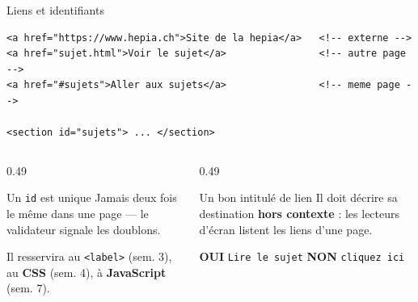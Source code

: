 \documentclass[aspectratio=169,11pt]{beamer}
\begin{document}
\begin{frame}[fragile]{Liens et identifiants}
\begin{lstlisting}[language=HTML5]
<a href="https://www.hepia.ch">Site de la hepia</a>   <!-- externe -->
<a href="sujet.html">Voir le sujet</a>                <!-- autre page -->
<a href="#sujets">Aller aux sujets</a>                <!-- meme page -->

<section id="sujets"> ... </section>
\end{lstlisting}
  \vspace{0.15cm}
  \begin{columns}[T]
    \begin{column}{0.49\textwidth}
      \begin{alertblock}{Un \texttt{id} est unique}
        Jamais deux fois le même dans une page --- le validateur signale les doublons.
        \vspace{0.1cm}

        Il resservira au \texttt{<label>} (sem. 3), au \textbf{CSS} (sem. 4), à \textbf{JavaScript} (sem. 7).
      \end{alertblock}
    \end{column}
    \begin{column}{0.49\textwidth}
      \begin{block}{Un bon intitulé de lien}
        Il doit décrire sa destination \textbf{hors contexte} : les lecteurs d'écran listent les liens d'une page.
        \vspace{0.1cm}

        \textcolor{successGreen}{\textbf{OUI}} \texttt{Lire le sujet} \quad
        \textcolor{alertRed}{\textbf{NON}} \texttt{cliquez ici}
      \end{block}
    \end{column}
  \end{columns}
\end{frame}
\end{document}
